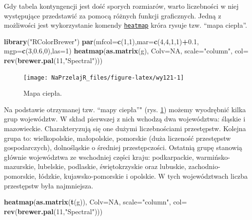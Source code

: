 \documentclass[polish,]{book}
\newenvironment{Shaded}{\begin{snugshade}}{\end{snugshade}}
\newcommand{\DataTypeTok}[1]{\textcolor[rgb]{0.13,0.29,0.53}{#1}}
\newcommand{\DecValTok}[1]{\textcolor[rgb]{0.00,0.00,0.81}{#1}}
\newcommand{\FloatTok}[1]{\textcolor[rgb]{0.00,0.00,0.81}{#1}}
\newcommand{\KeywordTok}[1]{\textcolor[rgb]{0.13,0.29,0.53}{\textbf{#1}}}
\newcommand{\NormalTok}[1]{#1}
\newcommand{\OperatorTok}[1]{\textcolor[rgb]{0.81,0.36,0.00}{\textbf{#1}}}
\newcommand{\OtherTok}[1]{\textcolor[rgb]{0.56,0.35,0.01}{#1}}
\newcommand{\StringTok}[1]{\textcolor[rgb]{0.31,0.60,0.02}{#1}}
\begin{document}
Gdy tabela kontyngencji jest dość sporych rozmiarów, warto liczebności w niej występujące przedstawić za pomocą różnych funkcji graficznych. Jedną z możliwości
jest wykorzystanie komendy \href{https://rdrr.io/r/stats/heatmap.html}{\texttt{heatmap}} króra rysuje tzw. ``mapa ciepła''.

\begin{Shaded}
\begin{Highlighting}[]
\KeywordTok{library}\NormalTok{(}\StringTok{"RColorBrewer"}\NormalTok{)}
\KeywordTok{par}\NormalTok{(}\DataTypeTok{mfcol=}\KeywordTok{c}\NormalTok{(}\DecValTok{1}\NormalTok{,}\DecValTok{1}\NormalTok{),}\DataTypeTok{mar=}\KeywordTok{c}\NormalTok{(}\DecValTok{4}\NormalTok{,}\DecValTok{4}\NormalTok{,}\DecValTok{1}\NormalTok{,}\DecValTok{1}\NormalTok{)}\OperatorTok{+}\FloatTok{0.1}\NormalTok{,}
    \DataTypeTok{mgp=}\KeywordTok{c}\NormalTok{(}\DecValTok{3}\NormalTok{,}\FloatTok{0.6}\NormalTok{,}\DecValTok{0}\NormalTok{),}\DataTypeTok{las=}\DecValTok{1}\NormalTok{)}
\KeywordTok{heatmap}\NormalTok{(}\KeywordTok{as.matrix}\NormalTok{(g), }\DataTypeTok{Colv=}\OtherTok{NA}\NormalTok{, }\DataTypeTok{scale=}\StringTok{"column"}\NormalTok{,}
        \DataTypeTok{col=} \KeywordTok{rev}\NormalTok{(}\KeywordTok{brewer.pal}\NormalTok{(}\DecValTok{11}\NormalTok{,}\StringTok{"Spectral"}\NormalTok{)))}
\end{Highlighting}
\end{Shaded}

\begin{figure}[h]

{\centering \texttt{[image: NaPrzelajR\_files/figure-latex/wy121-1]} 

}

\caption{Mapa ciepła.}\label{fig:wy121}
\end{figure}

Na podstawie otrzymanej tzw. ``mapy ciepła''" (rys. \ref{fig:wy121}) możemy wyodrębnić
kilka grup województw. W skład pierwszej z nich wchodzą dwa województwa: śląskie
i mazowieckie. Charakteryzują się one dużymi liczebnościami przestępstw. Kolejna
grupa to: wielkopolskie, małopolskie, pomorskie (duża liczeność przestępstw gospodarczych), dolnośląskie o średniej przestępczości. Ostatnią grupę stanowią głównie województwa ze wschodniej części kraju: podkarpackie, warmińsko-mazurskie,
lubelskie, podlaskie, świętokrzyskie oraz lubuskie, zachodnio-pomorskie, łódzkie,
kujawsko-pomorskie i opolskie. W tych województwach liczba przestępstw była najmniejsza.

\begin{Shaded}
\begin{Highlighting}[]
\KeywordTok{heatmap}\NormalTok{(}\KeywordTok{as.matrix}\NormalTok{(}\KeywordTok{t}\NormalTok{(g)), }\DataTypeTok{Colv=}\OtherTok{NA}\NormalTok{, }\DataTypeTok{scale=}\StringTok{"column"}\NormalTok{,}
\DataTypeTok{col=} \KeywordTok{rev}\NormalTok{(}\KeywordTok{brewer.pal}\NormalTok{(}\DecValTok{11}\NormalTok{,}\StringTok{"Spectral"}\NormalTok{)))}
\end{Highlighting}
\end{Shaded}
\end{document}
